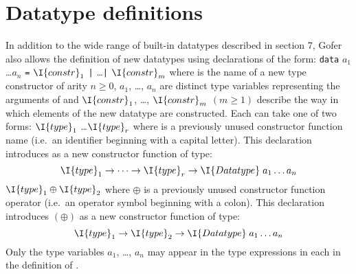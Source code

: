 \section{Datatype definitions}
In addition to the  wide  range  of  built-in  datatypes  described  in
section 7, Gofer also allows the  definition  of  new  datatypes  using
declarations of the form:
\BQ
     {\tt data}  $a_1$ \dots $a_n$ {\tt =}
      $\I{constr}_1$ {\tt|} \dots {\tt|} $\I{constr}_m$
\EQ
where  is the name of a new 
type constructor of arity $n\geq 0$,
$a_1$, \dots, $a_n$ are distinct 
type variables representing the  arguments  of
 and $\I{constr}_1$, \dots, 
$\I{constr}_m$ $(m\geq 1)$ describe the way in which
elements of the new datatype are constructed.  Each  can take one
of two forms:
\BI
\IT {} $\I{type}_1$ \dots $\I{type}_r$ 
    where  is a previously unused constructor
     function  name  (i.e.\  an  identifier  beginning  with  a  capital
     letter).  This declaration introduces  as  a  new  constructor
     function of type: 
\[
    \I{type}_1 \to \dots \to \I{type}_r \to \I{Datatype}\;a_1 \dots a_n
\]
\IT $\I{type}_1 \oplus \I{type}_2$ where $\oplus$ 
      is a previously  unused  constructor
     function  operator (i.e.\  an  operator  symbol  beginning  with  a
     colon).  This declaration introduces $(\oplus)$ as a new  constructor
     function of type: 
\[
    \I{type}_1 \to \I{type}_2 \to \I{Datatype}\;a_1 \dots a_n
\]
\EI
Only the type variables $a_1$, \dots, $a_n$
may appear in the type expressions
in each  in the definition of .


